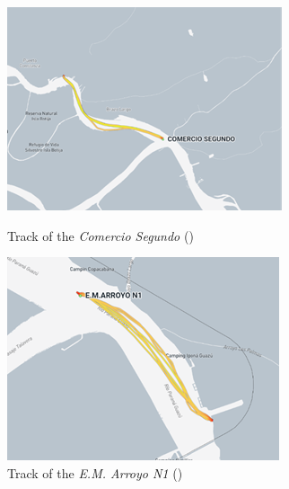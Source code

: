 \begin{figure}[H]
    \centering
    \begin{minipage}{0.48\textwidth}
        \centering
        \includegraphics[width=\linewidth]{figures/ch5/Track_CS.png}
        \caption{Track of the \textit{Comercio Segundo} (\cite{marinetraffic2025})}
        \label{fig:track_cs}
    \end{minipage}\hfill
    \begin{minipage}{0.48\textwidth}
        \centering
        \includegraphics[width=\linewidth]{figures/ch5/Track_EM.png}
        \caption{Track of the \textit{E.M. Arroyo N1} (\cite{marinetraffic2025})}
        \label{fig:track_em}
    \end{minipage}
\end{figure}

